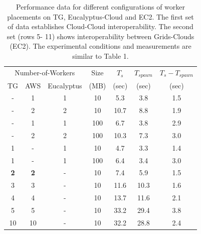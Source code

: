 \documentclass[conference,final]{IEEEtran}
\newcommand{\upp}{\vspace*{-0.6em}}
\begin{document}
\begin{table}
\upp
\begin{tabular}{ccccccc}
  \hline
  \multicolumn{3}{c}{Number-of-Workers}  &  Size   &  $T_s$  & $T_{spawn}$ & $T_s - T_{spawn}$\\   
  TG &  AWS & Eucalyptus &  (MB)  & (sec) & (sec) & (sec) \\
  \hline
  - & 1 & 1 & 10   & 5.3 & 3.8 & 1.5\\
  - & 2 & 2 & 10   & 10.7 & 8.8 & 1.9 \\
  - & 1 & 1 & 100  & 6.7 & 3.8 & 2.9\\
  - & 2 & 2 & 100  & 10.3 & 7.3 & 3.0\\
  \hline 
  1 & - & 1 & 10   & 4.7 & 3.3 & 1.4\\
  1 & - & 1 & 100  & 6.4 & 3.4 & 3.0\\
  \hline 
  {\bf 2} &   {\bf 2} & - & 10 & 7.4 & 5.9 & 1.5 \\
  3 & 3 & - & 10 & 11.6 & 10.3 & 1.6 \\
  4 & 4 & - & 10 & 13.7 & 11.6 & 2.1 \\
  5 & 5 & - & 10 & 33.2 & 29.4 & 3.8 \\ 
  10 & 10 & - & 10 & 32.2 & 28.8 & 2.4 \\
  \hline
   \hline 
\end{tabular}
\upp
\caption{Performance data for different configurations of worker placements
  on TG, Eucalyptus-Cloud and EC2. The first set of data
  establishes Cloud-Cloud interoperability. The second set 
  (rows 5- 11) shows interoperability between Grids-Clouds (EC2). 
  The experimental conditions and measurements are similar to Table 1.\vspace*{-1em}}
\label{stuff-2}
\upp
\upp
\end{table}
\end{document}
